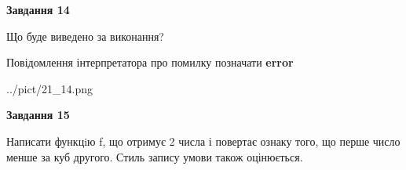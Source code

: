 \documentclass[11pt, ukrainian]{article}
\begin{document}
{\begin {large}
{\begin {center}\textbf{Завдання 14}\end {center}}\par
Що буде виведено за виконання? \par
Повідомлення інтерпретатора про помилку позначати \textbf{error}

\begin{center}
	{../pict/21_14.png}
\end{center}
\newpage

{\begin {center}\textbf{Завдання 15}\end {center}}\par

Написати функцiю f, що отримує 2 числа і повертає ознаку того, що перше число менше за куб другого. Стиль запису умови також оцінюється.\par
\newpage

\end {large}}
\end{document}
